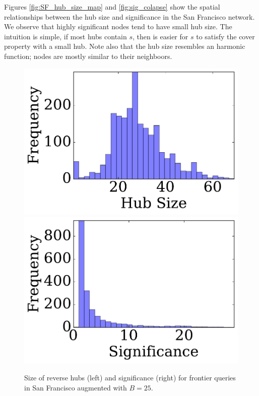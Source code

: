 Figures \ref{fig:SF_hub_size_map} and \ref{fig:sig_colapse} show the spatial relationships between the hub size and significance in the San Francisco network. 
We observe that highly significant nodes tend to have small hub size.
The intuition is simple, if most hubs contain $s$, then is easier for $s$ to satisfy the cover property with a small hub.
Note also that the hub size resembles an harmonic function; nodes are mostly similar to their neighboors.

\begin{figure} 
\includegraphics[clip, trim = 0.1cm 0.3cm 0cm 0cm,scale=0.27]{TexImg/SF_bwd_hub_size.pdf}
\includegraphics[clip, trim = 1.3cm 0.3cm 0cm 0cm,scale=0.27]{TexImg/significance.pdf}
\caption{Size of reverse hubs (left) and significance (right) for frontier queries in San Francisco augmented with $B=25$.}
\label{fig:SF_bwd_size}
\end{figure}
	
